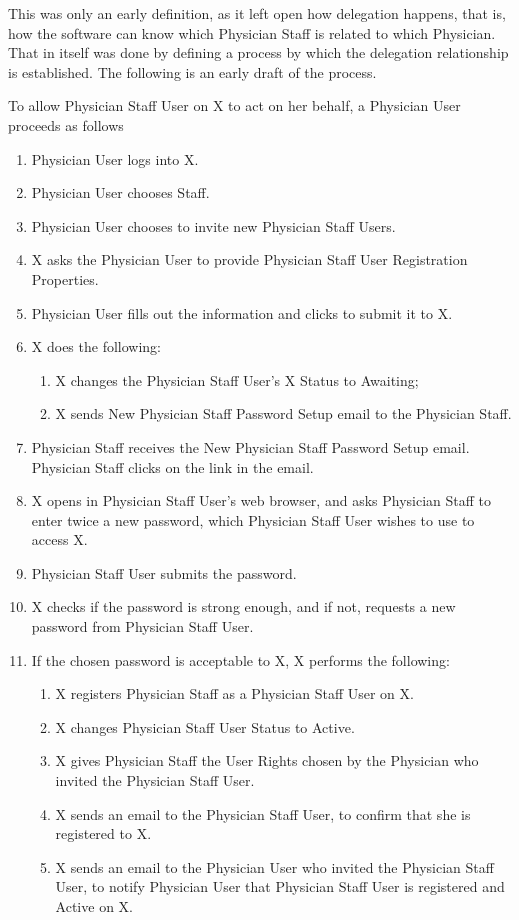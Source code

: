 \documentclass[graybox,envcountchap,sectrefs]{svmono}
\begin{document}
This was only an early definition, as it left open how delegation happens, that is, how the software can know which Physician Staff is related to which Physician. That in itself was done by defining a process by which the delegation relationship is established. The following is an early draft of the process.

\begin{svgraybox}
To allow Physician Staff User on X to act on her behalf, a Physician User proceeds as follows
\begin{enumerate}
	\item Physician User logs into X.
	\item Physician User chooses Staff.
	\item Physician User chooses to invite new Physician Staff Users.
	\item X asks the Physician User to provide Physician Staff User Registration Properties.
	\item Physician User fills out the information and clicks to submit it to X.
	\item X does the following:
		\begin{enumerate}
			\item X changes the Physician Staff User’s X Status to Awaiting;
			\item X sends New Physician Staff Password Setup email to the Physician Staff.
		\end{enumerate}
	\item Physician Staff receives the New Physician Staff Password Setup email. 
Physician Staff clicks on the link in the email.
	\item X opens in Physician Staff User’s web browser, and asks Physician Staff to enter twice a new password, which Physician Staff User wishes to use to access X.
	\item Physician Staff User submits the password.
	\item X checks if the password is strong enough, and if not, requests a new password from Physician Staff User.
	\item If the chosen password is acceptable to X, X performs the following:
		\begin{enumerate}
			\item X registers Physician Staff as a Physician Staff User on X.
			\item X changes Physician Staff User Status to Active.
			\item X gives Physician Staff the User Rights chosen by the Physician who invited the Physician Staff User.
			\item X sends an email to the Physician Staff User, to confirm that she is registered to X.
			\item X sends an email to the Physician User who invited the Physician Staff User, to notify Physician User that Physician Staff User is registered and Active on X.
		\end{enumerate}
\end{enumerate}
\end{svgraybox}
\end{document}
